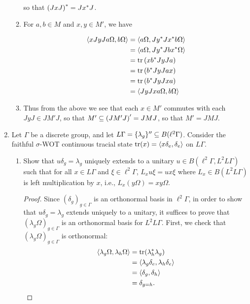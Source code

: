 \documentclass[a4paper,10pt]{report}
\newcommand{\ggen}[1]{\langle#1\rangle}
\DeclarePairedDelimiter{\set}{\{}{\}}
\begin{document}
\begin{enumerate}
\begin{enumerate}
                  so that $\left( J x J \right)^* = J x^* J$.\\

                \item For $a , b \in M$ and $x , y \in M'$, we have

                  \begin{align*}
                    \ET x J y J a \Omega , b \Omega \TE%
                    &= \ET a \Omega , J y^* J x^* b \Omega \TE\\
                    &= \ET a \Omega , J y^* J b x^* \Omega \TE\\
                    &= \tr \E x b^* J y J a \R\\
                    &= \tr \E b^* J y J a x \R\\
                    &= \tr \E b^* J y J x a \R\\
                    &= \ET J y J x a \Omega , b \Omega \TE
                  \end{align*}






                \item Thus from the above we see that each $x \in M'$ commutes with each $J y J \in J M' J$, so that $M' \subseteq \left( J M' J \right)' = J M J$, so that $M' = J M J$.\\



		\end{enumerate}
		\newpage
 \item 
 Let $\Gamma$ be a discrete group, and let $L\Gamma = \set{\lambda_g}'' \subseteq B(\ell^2\Gamma)$.
 Consider the faithful $\sigma$-WOT continuous tracial state
 $\tr(x) = \ggen{x\delta_e, \delta_e}$ on $L\Gamma$.
		\begin{enumerate}
			\item Show that $u\delta_g = \lambda_g$ uniquely extends to a unitary
				$u \in B(\ell^2\Gamma, L^2L\Gamma)$ such that for all $x \in L\Gamma$
				and $\xi \in \ell^2\Gamma$, $L_xu\xi = ux\xi$ where $L_x \in B(L^2L\Gamma)$
				is left multiplication by $x$, i.e., $L_x(y\Omega) = xy\Omega$.
				\begin{proof}
					Since $(\delta_g)_{g \in \Gamma}$ is an orthonormal basis in $\ell^2\Gamma$,
					in order to show that $u\delta_g = \lambda_g$ extends uniquely to a unitary,
					it suffices to prove that $(\lambda_g\Omega)_{g \in \Gamma}$ is an
					orthonormal basis for $L^2L\Gamma$.
					First, we check that $(\lambda_g\Omega)_{g \in \Gamma}$ is orthonormal:
					\begin{align*}
						\ggen{\lambda_g\Omega, \lambda_h\Omega}
						 & = \tr(\lambda_h^*\lambda_g) \\
						 & = \ggen{\lambda_g\delta_e, \lambda_h\delta_e} \\
						 & = \ggen{\delta_g, \delta_h} \\
						 & = \delta_{g = h}.
					\end{align*}
					

\end{proof}
\end{enumerate}
\end{enumerate}
\end{document}
